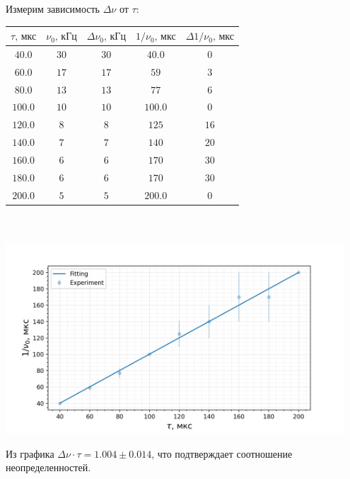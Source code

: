 Измерим зависимость $\Delta \nu$ от $\tau$:
\begin{center}
\begin{tabular}{|c|c|c|c|c|}\hline
$\tau\text{, мкс}$&$\nu_0\text{, кГц}$&$\Delta \nu_0\text{, кГц}$&$1/\nu_0\text{, мкс}$&$\Delta 1/\nu_0\text{, мкс}$\\\hline
$40.0$&$30$&$30$&$40.0$&$0$\\\hline
$60.0$&$17$&$17$&$59$&$3$\\\hline
$80.0$&$13$&$13$&$77$&$6$\\\hline
$100.0$&$10$&$10$&$100.0$&$0$\\\hline
$120.0$&$8$&$8$&$125$&$16$\\\hline
$140.0$&$7$&$7$&$140$&$20$\\\hline
$160.0$&$6$&$6$&$170$&$30$\\\hline
$180.0$&$6$&$6$&$170$&$30$\\\hline
$200.0$&$5$&$5$&$200.0$&$0$\\\hline
\end{tabular}\\~\\
\includegraphics[width=0.95\textwidth]{images/data.png}
\end{center}

Из графика $\Delta \nu \cdot \tau = 1.004\pm0.014$, что подтверждает соотношение неопределенностей.

